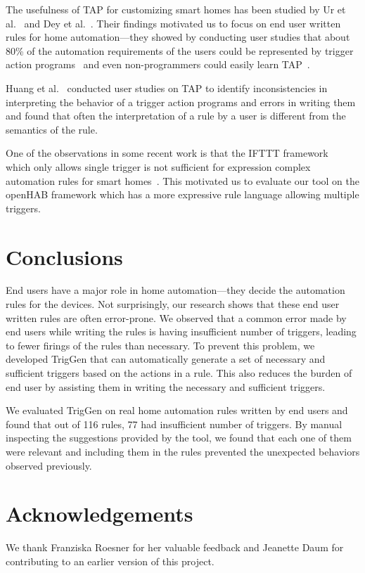 \documentclass{sig-alternate-05-2015}
\begin{document}
The usefulness of TAP for customizing smart homes has been studied by Ur et al.~\cite{practical-tap} and Dey et al.~\cite{dey}. Their findings motivated us to focus on end user written rules for home automation---they showed by conducting user studies that about 80\% of the automation requirements of the users could be represented by trigger action programs~\cite{dey} and even non-programmers could easily learn TAP~\cite{practical-tap}.

Huang et al.~\cite{Huang} conducted user studies on TAP to identify inconsistencies in interpreting the behavior of a trigger action programs and errors in writing them and found that often the interpretation of a rule by a user is different from the semantics of the rule. 

One of the observations in some recent work is that the IFTTT framework~\cite{iftttframework} which only allows single trigger is not sufficient for expression complex automation rules for smart homes~\cite{Huang, practical-tap}. This motivated us to evaluate our tool on the openHAB framework which has a more expressive rule language allowing multiple triggers. 


\section{Conclusions}
End users have a major role in home automation---they decide the automation rules for the devices. Not surprisingly, our research shows that these end user written rules are often error-prone.
We observed that a common error made by end users while writing the rules is having insufficient number of triggers, leading to fewer firings of the rules than necessary. To prevent this problem, we developed TrigGen that can automatically generate a set of necessary and sufficient triggers based on the actions in a rule. This also reduces the burden of end user by assisting them in writing the necessary and sufficient triggers. 

We evaluated TrigGen on real home automation rules written by end users and found that out of 116 rules, 77 had insufficient number of triggers. By manual inspecting the suggestions provided by the tool, we found that each one of them were relevant and including them in the rules prevented the unexpected behaviors observed previously. 


\section{Acknowledgements}
We thank Franziska Roesner for her valuable feedback and Jeanette Daum for contributing to an earlier version of this project.

  
\end{document}
